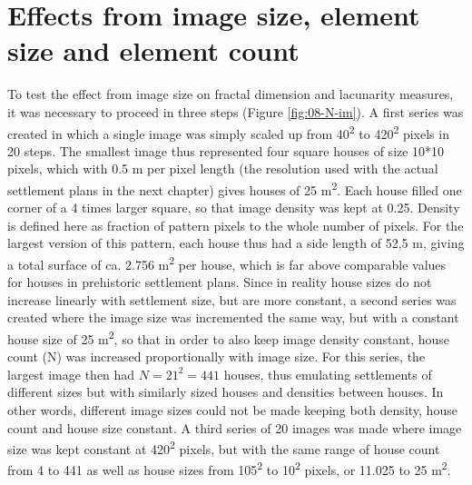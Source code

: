 \documentclass[
  12pt,
]{book}
\begin{document}
\hypertarget{effects-from-image-size-element-size-and-element-count}{%
\section{Effects from image size, element size and element count}\label{effects-from-image-size-element-size-and-element-count}}

To test the effect from image size on fractal dimension and lacunarity measures, it was necessary to proceed in three steps (Figure \ref{fig:08-N-im}). A first series was created in which a single image was simply scaled up from 40\textsuperscript{2} to 420\textsuperscript{2} pixels in 20 steps. The smallest image thus represented four square houses of size 10*10 pixels, which with 0.5 m per pixel length (the resolution used with the actual settlement plans in the next chapter) gives houses of 25 m\textsuperscript{2}. Each house filled one corner of a 4 times larger square, so that image density was kept at 0.25. Density is defined here as fraction of pattern pixels to the whole number of pixels. For the largest version of this pattern, each house thus had a side length of 52,5 m, giving a total surface of ca. 2.756 m\textsuperscript{2} per house, which is far above comparable values for houses in prehistoric settlement plans. Since in reality house sizes do not increase linearly with settlement size, but are more constant, a second series was created where the image size was incremented the same way, but with a constant house size of 25 m\textsuperscript{2}, so that in order to also keep image density constant, house count (N) was increased proportionally with image size. For this series, the largest image then had \(N = 21^2 = 441\) houses, thus emulating settlements of different sizes but with similarly sized houses and densities between houses. In other words, different image sizes could not be made keeping both density, house count and house size constant. A third series of 20 images was made where image size was kept constant at 420\textsuperscript{2} pixels, but with the same range of house count from 4 to 441 as well as house sizes from 105\textsuperscript{2} to 10\textsuperscript{2} pixels, or 11.025 to 25 m\textsuperscript{2}.
\end{document}
